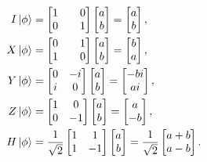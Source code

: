 \begin{align*}
    I\ket{\phi} & =
    \begin{bmatrix}
        1 &  & 0 \\
        0 &  & 1
    \end{bmatrix}
    \begin{bmatrix}
        a \\
        b
    \end{bmatrix}=
    \begin{bmatrix}
        a \\
        b
    \end{bmatrix},  \\
    X\ket{\phi} & =
    \begin{bmatrix}
        0 &  & 1 \\
        1 &  & 0
    \end{bmatrix}
    \begin{bmatrix}
        a \\
        b
    \end{bmatrix}=
    \begin{bmatrix}
        b \\
        a
    \end{bmatrix},  \\
    Y\ket{\phi} & =
    \begin{bmatrix}
        0 & -i \\
        i & 0
    \end{bmatrix}
    \begin{bmatrix}
        a \\
        b
    \end{bmatrix}=
    \begin{bmatrix}
        -bi \\
        ai
    \end{bmatrix},  \\
    Z\ket{\phi} & =
    \begin{bmatrix}
        1 & 0 \\
        0 & -1
    \end{bmatrix}
    \begin{bmatrix}
        a \\
        b
    \end{bmatrix}=
    \begin{bmatrix}
        a \\
        -b
    \end{bmatrix}, \\
    H\ket{\phi} & =
    \frac{1}{\sqrt{2}}
    \begin{bmatrix}
        1 & 1  \\
        1 & -1
    \end{bmatrix}
    \begin{bmatrix}
        a \\
        b
    \end{bmatrix}=
    \frac{1}{\sqrt{2}}
    \begin{bmatrix}
        a+b \\
        a-b
    \end{bmatrix}.
\end{align*}

